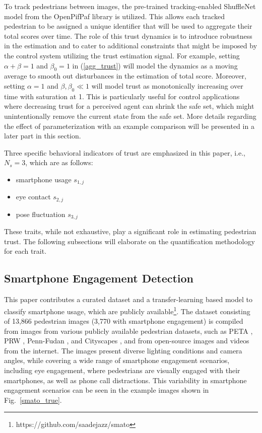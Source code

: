 \documentclass[journal]{IEEEtran}
\begin{document}
To track pedestrians between images, the pre-trained tracking-enabled ShuffleNet model \cite{zhang2018shufflenet} from the OpenPifPaf \cite{kreiss2021openpifpaf} library is utilized. This allows each tracked pedestrian to be assigned a unique identifier that will be used to aggregate their total scores over time. The role of this trust dynamics is to introduce robustness in the estimation and to cater to additional constraints that might be imposed by the control system utilizing the trust estimation signal. For example, setting $\alpha + \beta = 1$ and $\beta_0 = 1$ in (\ref{agg_trust}) will model the dynamics as a moving average to smooth out disturbances in the estimation of total score. Moreover, setting $\alpha = 1$ and $\beta, \beta_0 \ll 1$ will model trust as monotonically increasing over time with saturation at 1. This is particularly useful for control applications where decreasing trust for a perceived agent can shrink the safe set, which might unintentionally remove the current state from the safe set.  More details regarding the effect of parameterization with an example comparison will be presented in a later part in this section.

Three specific behavioral indicators of trust are emphasized in this paper, i.e., $N_s = 3$, which are as follows:
\begin{itemize}
    \item smartphone usage $s_{1,j}$
    \item eye contact $s_{2,j}$
    \item pose fluctuation $s_{3,j}$
\end{itemize}
These traits, while not exhaustive, play a significant role in estimating pedestrian trust. The following subsections will elaborate on the quantification methodology for each trait.

\subsection{Smartphone Engagement Detection}

This paper contributes a curated dataset and a transfer-learning based model to classify smartphone usage, which are publicly available\footnote{https://github.com/saadejazz/smato}. The dataset consisting of 13,866 pedestrian images (3,770 with smartphone engagement) is compiled from images from various publicly available pedestrian datasets, such as PETA \cite{deng2014pedestrian}, PRW \cite{zheng2017person}, Penn-Fudan \cite{wang2007object}, and Cityscapes \cite{cordts2015cityscapes}, and from open-source images and videos from the internet. The images present diverse lighting conditions and camera angles, while covering a wide range of smartphone engagement scenarios, including eye engagement, where pedestrians are visually engaged with their smartphones, as well as phone call distractions. This variability in smartphone engagement scenarios can be seen in the example images shown in Fig.~\ref{smato_true}.
\end{document}
